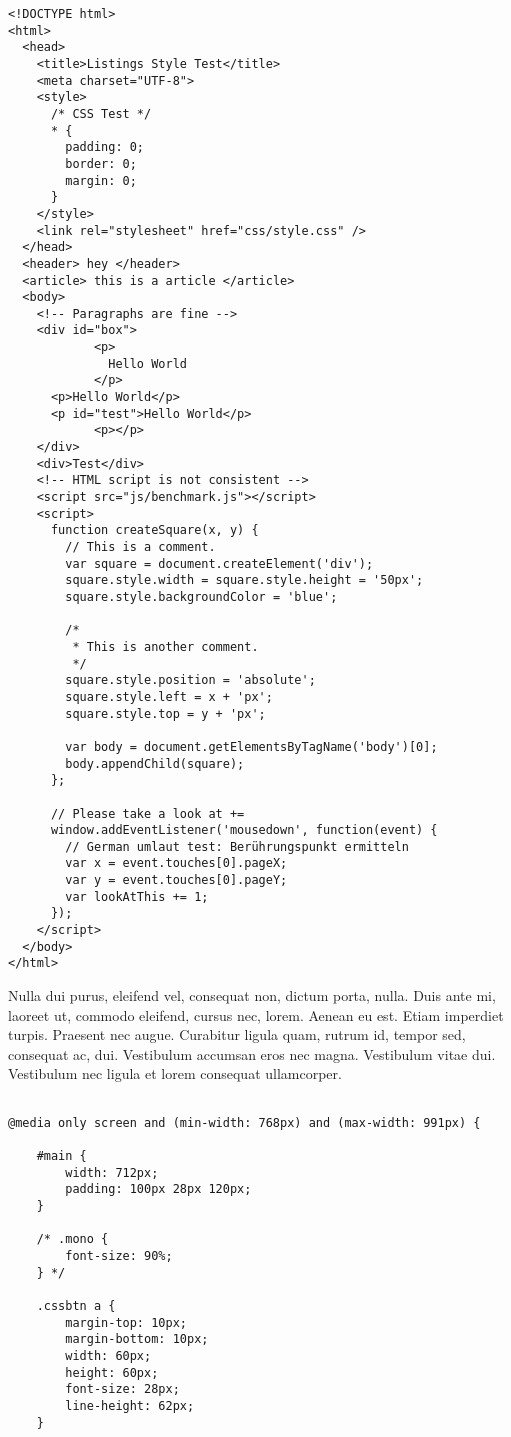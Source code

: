 \begin{lstlisting}[style=htmlcssjs,caption={HTML with CSS Code}]
<!DOCTYPE html>
<html>
  <head>
    <title>Listings Style Test</title>
    <meta charset="UTF-8">
    <style>
      /* CSS Test */
      * {
        padding: 0;
        border: 0;
        margin: 0;
      }
    </style>
    <link rel="stylesheet" href="css/style.css" />
  </head>
  <header> hey </header>
  <article> this is a article </article>
  <body>
    <!-- Paragraphs are fine -->
    <div id="box">			
			<p>
			  Hello World
			</p>
      <p>Hello World</p>
      <p id="test">Hello World</p>
			<p></p>
    </div>
    <div>Test</div>
    <!-- HTML script is not consistent -->
    <script src="js/benchmark.js"></script>
    <script>
      function createSquare(x, y) {
        // This is a comment.
        var square = document.createElement('div');
        square.style.width = square.style.height = '50px';
        square.style.backgroundColor = 'blue';
        
        /*
         * This is another comment.
         */
        square.style.position = 'absolute';
        square.style.left = x + 'px'; 
        square.style.top = y + 'px';
        
        var body = document.getElementsByTagName('body')[0];
        body.appendChild(square);
      };
      
      // Please take a look at +=
      window.addEventListener('mousedown', function(event) {
        // German umlaut test: Berührungspunkt ermitteln
        var x = event.touches[0].pageX;
        var y = event.touches[0].pageY;
        var lookAtThis += 1;
      });
    </script>
  </body>
</html>
\end{lstlisting}

Nulla dui purus, eleifend vel, consequat non, dictum porta, nulla. Duis ante mi, laoreet ut, commodo eleifend, cursus nec, lorem. Aenean eu est. Etiam imperdiet turpis. Praesent nec augue. Curabitur ligula quam, rutrum id, tempor sed, consequat ac, dui. Vestibulum accumsan eros nec magna. Vestibulum vitae dui. Vestibulum nec ligula et lorem consequat ullamcorper.

\begin{lstlisting}[style=htmlcssjs,caption={HTML CSS Javascript Code}]

@media only screen and (min-width: 768px) and (max-width: 991px) {
	
	#main {
		width: 712px;
		padding: 100px 28px 120px;
	}
	
	/* .mono {
		font-size: 90%;
	} */
	
	.cssbtn a {
		margin-top: 10px;
		margin-bottom: 10px;
		width: 60px;  
		height: 60px;   
		font-size: 28px;
		line-height: 62px;
	}
\end{lstlisting}

